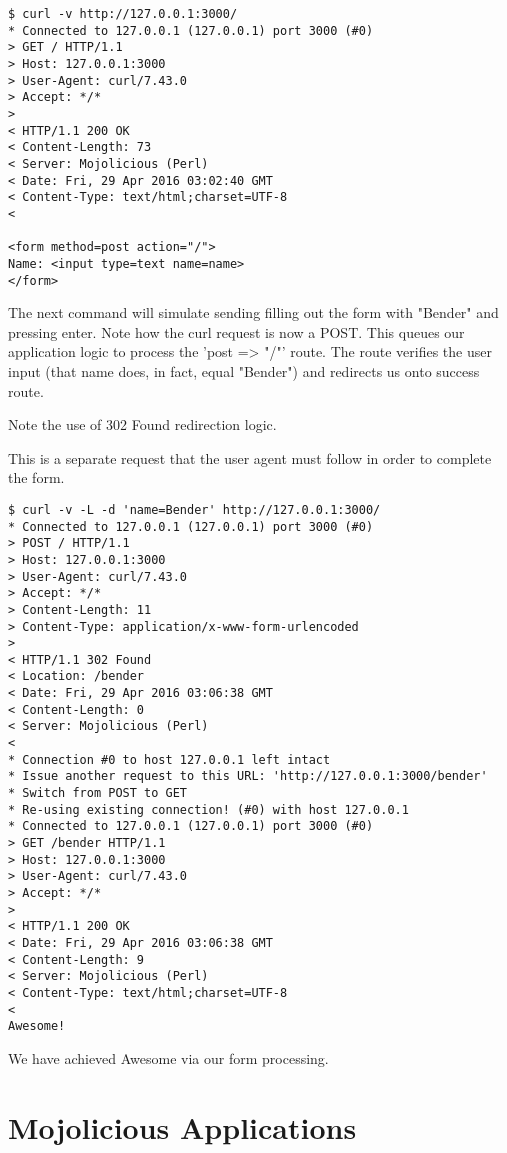 \documentclass[14pt]{extreport}
\begin{document}
\begin{lstlisting}[style=BashOutputStyle]
$ curl -v http://127.0.0.1:3000/
* Connected to 127.0.0.1 (127.0.0.1) port 3000 (#0)
> GET / HTTP/1.1
> Host: 127.0.0.1:3000
> User-Agent: curl/7.43.0
> Accept: */*
> 
< HTTP/1.1 200 OK
< Content-Length: 73
< Server: Mojolicious (Perl)
< Date: Fri, 29 Apr 2016 03:02:40 GMT
< Content-Type: text/html;charset=UTF-8
< 

<form method=post action="/">
Name: <input type=text name=name>
</form>
\end{lstlisting}

The next command will simulate sending filling out the form with "Bender" and
pressing enter.  Note how the curl request is now a POST.  This queues our
application logic to process the 'post => "/"' route.  The route verifies the
user input (that name does, in fact, equal "Bender") and redirects us onto
success route.

Note the use of 302 Found redirection logic.

This is a separate request that the user agent must follow in order to complete
the form.

\begin{lstlisting}[style=BashOutputStyle]
$ curl -v -L -d 'name=Bender' http://127.0.0.1:3000/
* Connected to 127.0.0.1 (127.0.0.1) port 3000 (#0)
> POST / HTTP/1.1
> Host: 127.0.0.1:3000
> User-Agent: curl/7.43.0
> Accept: */*
> Content-Length: 11
> Content-Type: application/x-www-form-urlencoded
> 
< HTTP/1.1 302 Found
< Location: /bender
< Date: Fri, 29 Apr 2016 03:06:38 GMT
< Content-Length: 0
< Server: Mojolicious (Perl)
< 
* Connection #0 to host 127.0.0.1 left intact
* Issue another request to this URL: 'http://127.0.0.1:3000/bender'
* Switch from POST to GET
* Re-using existing connection! (#0) with host 127.0.0.1
* Connected to 127.0.0.1 (127.0.0.1) port 3000 (#0)
> GET /bender HTTP/1.1
> Host: 127.0.0.1:3000
> User-Agent: curl/7.43.0
> Accept: */*
> 
< HTTP/1.1 200 OK
< Date: Fri, 29 Apr 2016 03:06:38 GMT
< Content-Length: 9
< Server: Mojolicious (Perl)
< Content-Type: text/html;charset=UTF-8
< 
Awesome!
\end{lstlisting}

We have achieved Awesome via our form processing.

\chapter*{Mojolicious Applications}
\end{document}
